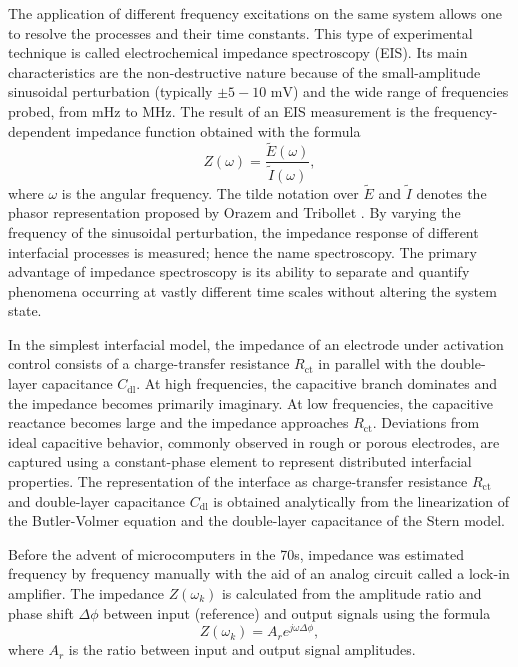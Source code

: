 The application of different frequency excitations on the same system allows one to resolve the processes and their time constants.
This type of experimental technique is called electrochemical impedance spectroscopy (EIS).
Its main characteristics are the non-destructive nature because of the small-amplitude sinusoidal perturbation (typically $\pm 5-10 \text{ mV}$) and the wide range of frequencies probed, from mHz to MHz.
The result of an EIS measurement is the frequency-dependent impedance function obtained with the formula
\begin{equation}
    Z(\omega) = \frac{\tilde{E}(\omega)}{\tilde{I}(\omega)},
\end{equation}
where $\omega$ is the angular frequency.
The tilde notation over $\tilde{E}$ and $\tilde{I}$ denotes the phasor representation proposed by Orazem and Tribollet \cite{orazemEIS}.
By varying the frequency of the sinusoidal perturbation, the impedance response of different interfacial processes is measured; hence the name spectroscopy.
The primary advantage of impedance spectroscopy is its ability to separate and quantify phenomena occurring at vastly different time scales without altering the system state.

In the simplest interfacial model, the impedance of an electrode under activation control consists of a charge-transfer resistance $R_{\mathrm{ct}}$ in parallel with the double-layer capacitance $C_{\mathrm{dl}}$. 
At high frequencies, the capacitive branch dominates and the impedance becomes primarily imaginary.
At low frequencies, the capacitive reactance becomes large and the impedance approaches $R_{\mathrm{ct}}$. 
Deviations from ideal capacitive behavior, commonly observed in rough or porous electrodes, are captured using a constant-phase element to represent distributed interfacial properties.
The representation of the interface as charge-transfer resistance $R_{\mathrm{ct}}$ and double-layer capacitance $C_{\mathrm{dl}}$ is obtained analytically from the linearization of the Butler-Volmer equation and the double-layer capacitance of the Stern model.

Before the advent of microcomputers in the 70s, impedance was estimated frequency by frequency manually with the aid of an analog circuit called a lock-in amplifier.
The impedance $Z(\omega_k)$ is calculated from the amplitude ratio and phase shift $\Delta\phi$ between input (reference) and output signals using the formula 
\begin{equation}
Z(\omega_k) = A_r e^{j\omega\Delta\phi},
\end{equation}
where $A_r$ is the ratio between input and output signal amplitudes.

